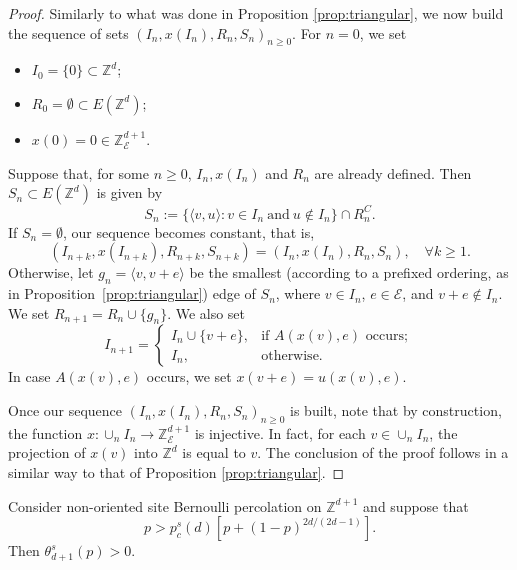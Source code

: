 \documentclass{aptpub}
\newcommand{\Z}{\mathbb{Z}}
\newcommand{\Ee}{\mathcal{E}}
\begin{document}
\begin{proof}
Similarly to what was done in Proposition \ref{prop:triangular}, we now build the sequence of sets $(I_n, x(I_n), R_n, S_n)_{n \geq 0}$. For $n =0$, we set
\begin{itemize}
    \item $I_0 = \{0\} \subset \Z^d$;
    \item $R_0 = \emptyset \subset E(\Z^d)$;
    \item $x(0) = 0 \in \Z_{\Ee}^{d+1}.$
\end{itemize}
Suppose that, for some $n \geq 0$, $I_n, x(I_n)$ and $R_n$ are already defined. Then $S_n \subset E(\Z^d)$ is given by
\begin{equation*}%
    S_{n} := \{ \langle v, u \rangle : v \in I_{n} \: \mbox{and} \: u \notin I_{n} \} \cap R_{n}^C.
\end{equation*}
If $S_n = \emptyset$, our sequence becomes constant, that is, 
\begin{equation}\label{eq:stop}
    (I_{n+k}, x(I_{n+k}), R_{n+k}, S_{n+k}) = (I_n, x(I_n), R_n, S_n), \quad \forall k \geq 1.
\end{equation} 
Otherwise, let $g_n = \langle v , v + e \rangle$ be the smallest (according to a prefixed ordering, as in Proposition~\ref{prop:triangular}) edge of $S_n$, where $v \in I_n$, $e \in {\Ee}$, and $v+e \notin I_n$. We set $R_{n+1} = R_n \cup \{g_n\}$. We also set
\begin{equation*}
    I_{n+1} = 
    \begin{cases} I_n \cup \{v+e\}, &\text{if } A(x(v),e) \text{ occurs};\\
                  I_n, & \text{otherwise}.
    \end{cases}
\end{equation*}
In case  $A(x(v),e)$ occurs, we set $x(v+e) = u(x(v),e)$. 

Once our sequence $(I_n, x(I_n), R_n, S_n)_ {n \geq 0}$ is built, note that by construction, the function $x: \cup_n I_n \longrightarrow \Z^{d+1}_{\Ee}$ is injective. In fact, for each $v \in \cup_n I_n$, the projection of $x(v)$ into $\Z^d$ is equal to $v$. The conclusion of the proof follows in a similar way to that of Proposition \ref{prop:triangular}.
\end{proof}

\begin{prop}\label{prop:crossoversite}
Consider non-oriented site Bernoulli percolation on $\Z^{d+1}$ and suppose that 
\begin{equation}\label{eq:cross1}
p > p^s_c(d)  \left[p + (1-p)^{2d/(2d-1)}\right].
\end{equation}
Then $\theta^s_{d+1}(p)>0$.
\end{prop}
\end{document}

